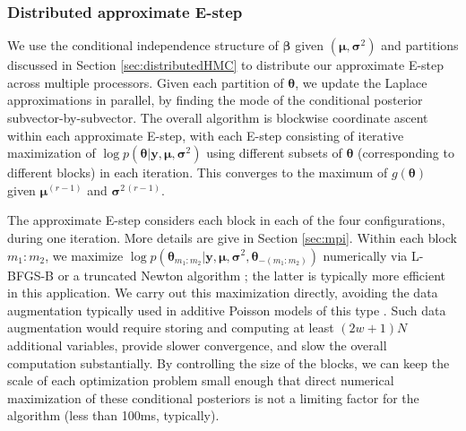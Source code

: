 \documentclass[12pt]{article}
\begin{document}

\subsubsection{Distributed approximate E-step}
\label{sec:parallelization}

We use the conditional independence structure of $\bm \beta$ given $(\bm \mu, \bm \sigma^2)$ and partitions discussed in Section \ref{sec:distributedHMC} to distribute our approximate E-step across multiple processors.
Given each partition of $\bm \theta$, we update the Laplace approximations in parallel, by finding the mode of the conditional posterior subvector-by-subvector.
The overall algorithm is blockwise coordinate ascent within each approximate E-step, with each E-step consisting of iterative maximization of $\log p(\bm \theta | \bm y, \bm \mu, \bm \sigma^2 )$ using different subsets of $\bm \theta$ (corresponding to different blocks) in each iteration.
This converges to the maximum of $g(\bm \theta)$ given $\bm \mu^{(r-1)}$ and $\bm \sigma^{2\,(r-1)}$.

The approximate E-step considers each block in each of the four configurations, during one iteration. 
More details are give in Section \ref{sec:mpi}.
Within each block $m_1:m_2$, we maximize $\log p(\bm \theta_{m_1:m_2} | \bm y, \bm \mu, \bm \sigma^2, \bm \theta_{-(m_1:m_2)} )$ numerically via L-BFGS-B or a truncated Newton algorithm \citep{lbfgsb1997, Nash2000}; the latter is typically more efficient in this application.
We carry out this maximization directly, avoiding the data augmentation typically used in additive Poisson models of this type \citep[e.g.,][]{VanDykEtAl2006}. 
Such data augmentation would require storing and computing at least $(2w+1)N$ additional variables, provide slower convergence, and slow the overall computation substantially.
By controlling the size of the blocks, we can keep the scale of each optimization problem small enough that direct numerical maximization of these conditional posteriors is not a limiting factor for the algorithm (less than 100ms, typically).
\end{document}
